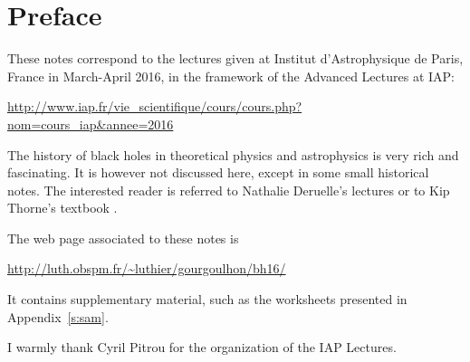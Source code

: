 \chapter*{Preface}

These notes correspond to the lectures given at
Institut d'Astrophysique de Paris, France in March-April 2016, in the
framework of the Advanced Lectures at IAP:

\centerline{\url{http://www.iap.fr/vie_scientifique/cours/cours.php?nom=cours_iap&annee=2016}}

\vspace{2ex}

The history of black holes in theoretical physics and astrophysics is
very rich and fascinating. It is however not discussed here, except in some
small historical notes. The interested
reader is referred to Nathalie Deruelle's lectures \cite{Derue09} or to Kip Thorne's
textbook \cite{Thorn94}.


The web page associated to these notes is

\centerline{\url{http://luth.obspm.fr/~luthier/gourgoulhon/bh16/}}

It contains supplementary material, such as the worksheets presented in
Appendix~\ref{s:sam}.

\vspace{2ex}

I warmly thank Cyril Pitrou for the organization of the IAP Lectures.
